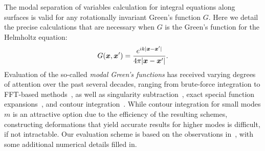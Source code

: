 \documentclass[11pt]{article}
\newcommand{\vct}{\vectorsym}
\newcommand{\bx}{\vct{ x}}
\numberwithin{equation}{section}
\begin{document}
The modal separation of variables calculation for integral equations
along surfaces is valid for any rotationally invariant Green's
function $G$.  Here we detail the precise calculations that are
necessary 
when $G$ is the Green's function for the Helmholtz equation:
\begin{equation}\label{eq_gk}
G(\bx,\bx') = \frac{e^{ik|\bx-\bx'|}}{4\pi |\bx-\bx'|}.
\end{equation}
Evaluation of the so-called {\em modal Green's functions} has received
varying degrees of attention over the past several decades, ranging
from brute-force integration to FFT-based
methods~\cite{gedney1990use,young}, as well as singularity
subtraction~\cite{helsing_2014}, exact special function
expansions~\cite{conway_cohl}, and contour
integration~\cite{gustafsson2010accurate}. While contour integration
for small modes $m$ is an attractive option due to the efficiency of
the resulting schemes, constructing deformations that yield accurate
results for higher modes is difficult, if not intractable.
Our evaluation scheme is based on the observations
in~\cite{helsing_2014}, with some additional numerical details filled in.
\end{document}
